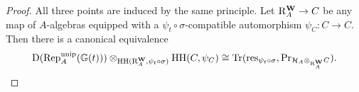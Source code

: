 \documentclass[a4paper, 10pt, oneside, reqno]{amsart}
\theoremstyle{plain}
\theoremstyle{definition}
\theoremstyle{remark}
\newcommand{\Gbb}{\mathbb{G}}
\newcommand{\RR}{\mathrm{R}}
\newcommand{\HHH}{\mathrm{HH}}
\newcommand{\Prr}{\mathrm{Pr}}
\newcommand{\restr}{\mathrm{res}}
\begin{document}
\begin{proof} 

All three points are induced by the same principle. Let $\RR_A^{\Wbf} \to C$ be any map of $A$-algebras equipped with a $\psi_t \circ \sigma$-compatible automorphism $\psi_C : C \to C$. Then there is a canonical equivalence 
$$\DD(\Rep_{A}^{\unip}(\Gbb(t))) \otimes_{\HHH(\RR_{A}^{\Wbf}, \psi_t \circ \sigma)}\HHH(C, \psi_C) \cong \Tr(\restr_{\psi_t \circ \sigma}, \Prr_{\Hcal_{A} \otimes_{\RR_A^{\Wbf}} C}).$$


\end{proof}
\end{document}
